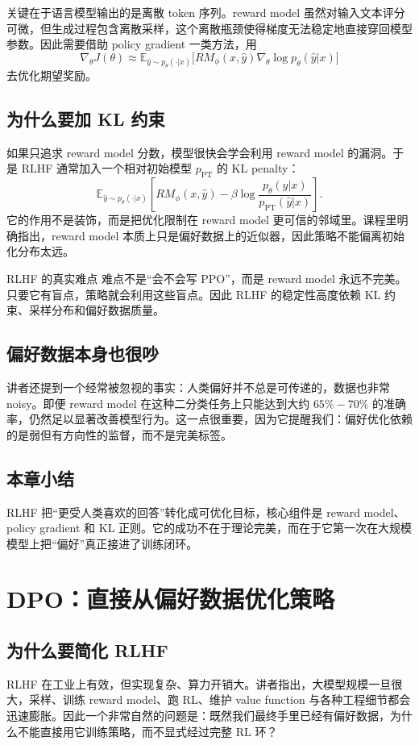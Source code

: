 \documentclass[a4paper]{article}
\begin{document}
关键在于语言模型输出的是离散 token 序列。reward model 虽然对输入文本评分可微，但生成过程包含离散采样，这个离散瓶颈使得梯度无法稳定地直接穿回模型参数。因此需要借助 policy gradient 一类方法，用
\[
\nabla_\theta J(\theta)
\approx
\mathbb{E}_{\hat y \sim p_\theta(\cdot|x)}
\bigl[
RM_\phi(x,\hat y)\nabla_\theta \log p_\theta(\hat y|x)
\bigr]
\]
去优化期望奖励。

\subsection{为什么要加 KL 约束}
如果只追求 reward model 分数，模型很快会学会利用 reward model 的漏洞。于是 RLHF 通常加入一个相对初始模型 $p_{\mathrm{PT}}$ 的 KL penalty：
\[
\mathbb{E}_{\hat y \sim p_\theta(\cdot|x)}
\left[
RM_\phi(x,\hat y)-\beta \log \frac{p_\theta(\hat y|x)}{p_{\mathrm{PT}}(\hat y|x)}
\right].
\]
它的作用不是装饰，而是把优化限制在 reward model 更可信的邻域里。课程里明确指出，reward model 本质上只是偏好数据上的近似器，因此策略不能偏离初始化分布太远。

\begin{warningbox}{RLHF 的真实难点}
难点不是“会不会写 PPO”，而是 reward model 永远不完美。只要它有盲点，策略就会利用这些盲点。因此 RLHF 的稳定性高度依赖 KL 约束、采样分布和偏好数据质量。
\end{warningbox}

\subsection{偏好数据本身也很吵}
讲者还提到一个经常被忽视的事实：人类偏好并不总是可传递的，数据也非常 noisy。即便 reward model 在这种二分类任务上只能达到大约 $65\%-70\%$ 的准确率，仍然足以显著改善模型行为。这一点很重要，因为它提醒我们：偏好优化依赖的是弱但有方向性的监督，而不是完美标签。

\subsection{本章小结}
RLHF 把“更受人类喜欢的回答”转化成可优化目标，核心组件是 reward model、policy gradient 和 KL 正则。它的成功不在于理论完美，而在于它第一次在大规模模型上把“偏好”真正接进了训练闭环。

\section{DPO：直接从偏好数据优化策略}

\subsection{为什么要简化 RLHF}
RLHF 在工业上有效，但实现复杂、算力开销大。讲者指出，大模型规模一旦很大，采样、训练 reward model、跑 RL、维护 value function 与各种工程细节都会迅速膨胀。因此一个非常自然的问题是：既然我们最终手里已经有偏好数据，为什么不能直接用它训练策略，而不显式经过完整 RL 环？
\end{document}

